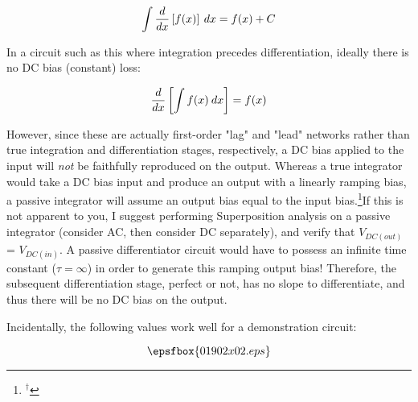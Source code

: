 $$\int {d \over dx} \left[ f(x) \right] \> dx = f(x) + C$$

In a circuit such as this where integration precedes differentiation, ideally there is no DC bias (constant) loss:

$${d \over dx} \left[ \int f(x) \> dx \right] = f(x)$$


However, since these are actually first-order "lag" and "lead" networks rather than true integration and differentiation stages, respectively, a DC bias applied to the input will {\it not} be faithfully reproduced on the output.  Whereas a true integrator would take a DC bias input and produce an output with a linearly ramping bias, a passive integrator will assume an output bias equal to the input bias.\footnote{$^{\dag}$}{If this is not apparent to you, I suggest performing Superposition analysis on a passive integrator (consider AC, then consider DC separately), and verify that $V_{DC(out)}$ = $V_{DC(in)}$.  A passive differentiator circuit would have to possess an infinite time constant ($\tau = \infty$) in order to generate this ramping output bias!}  Therefore, the subsequent differentiation stage, perfect or not, has no slope to differentiate, and thus there will be no DC bias on the output.

Incidentally, the following values work well for a demonstration circuit:  

$$\epsfbox{01902x02.eps}$$




